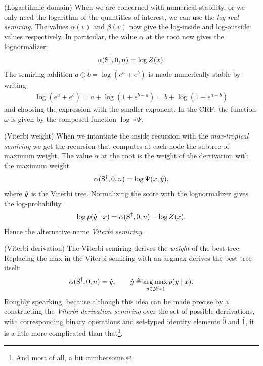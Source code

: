 \begin{example}{(Logartihmic domain)}
  When we are concerned with numerical stability, or we only need the logarithm of the quantities of interest, we can use the \textit{log-real semiring}. The values $\alpha(v)$ and $\beta(v)$ now give the log-inside and log-outside values respectively. In particular, the value $\alpha$ at the root now gives the lognormalizer:
  \begin{align*}
    \alpha(\text{S}^{\dagger}, 0, n) = \log Z(x).
  \end{align*}
  The semiring addition $a \oplus b = \log(e^{a} + e^{b})$ is made numerically stable by writing
  \begin{align*}
    \log(e^{a} + e^{b}) = a + \log(1 + e^{b-a}) = b + \log(1 + e^{a-b})
  \end{align*}
  and choosing the expression with the smaller exponent. In the CRF, the function $\omega$ is given by the composed function $\log \circ \Psi$.
\end{example}

\begin{example}{(Viterbi weight)}
  \label{ex:vit-weight}
  When we intantiate the inside recursion with the \textit{max-tropical semiring} we get the recursion that computes at each node the subtree of maximum weight. The value $\alpha$ at the root is the weight of the derrivation with the maximum weight
  \begin{align*}
    \alpha(\text{S}^{\dagger}, 0, n) = \log \Psi(x, \hat{y}),
  \end{align*}
  where $\hat{y}$ is the Viterbi tree. Normalizing the score with the lognormalizer gives the log-probability
  \begin{align*}
    \log p(\hat{y} \mid x) = \alpha(\text{S}^{\dagger}, 0, n) - \log Z(x).
  \end{align*}
  Hence the alternative name \textit{Viterbi semiring}.
\end{example}

\begin{example}{(Viterbi derivation)}
  \label{ex:vit-derivation}
  The Viterbi semiring derives the \textit{weight} of the best tree. Replacing the max in the Viterbi semiring with an argmax derives the best tree itself:
  \begin{align*}
    \alpha(\text{S}^{\dagger}, 0, n) = \hat{y}, \qquad \hat{y} \triangleq \operatorname*{arg\,max}_{y \in \mathcal{Y}(x)} p(y \mid x).
  \end{align*}
  Roughly spearking, because although this idea can be made precise by a constructing the \textit{Viterbi-derivation semiring} \citep{goodman1999semiring} over the set of possible derrivations, with corresponding binary operations and set-typed identity elements $\bar{0}$ and $\bar{1}$, it is a litle more complicated than that\footnote{And most of all, a bit cumbersome.}.
\end{example}

